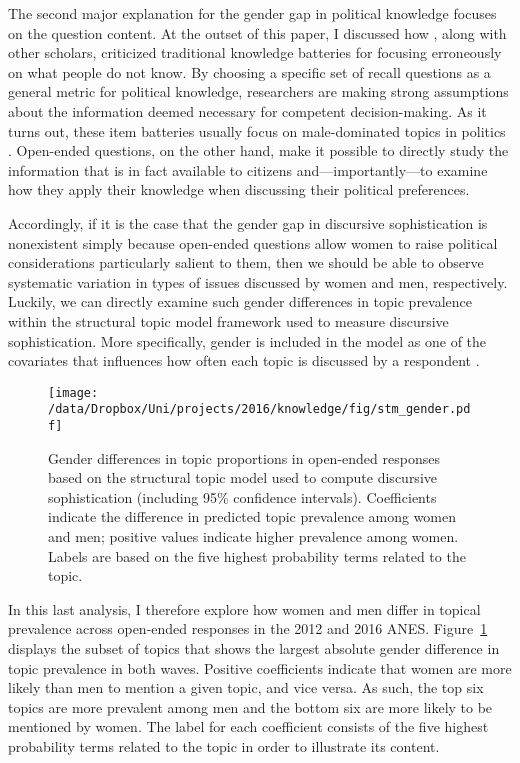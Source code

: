 The second major explanation for the gender gap in political knowledge focuses on the question content. At the outset of this paper, I discussed how \citet{cramer2017fact}, along with other scholars, criticized traditional knowledge batteries for focusing erroneously on what people do not know. By choosing a specific set of recall questions as a general metric for political knowledge, researchers are making strong assumptions about the information deemed necessary for competent decision-making. As it turns out, these item batteries usually focus on male-dominated topics in politics \citep{dolan2011women}. Open-ended questions, on the other hand, make it possible to directly study the information that is in fact available to citizens and---importantly---to examine how they apply their knowledge when discussing their political preferences.

Accordingly, if it is the case that the gender gap in discursive sophistication is nonexistent simply because open-ended questions allow women to raise political considerations particularly salient to them, then we should be able to observe systematic variation in types of issues discussed by women and men, respectively. Luckily, we can directly examine such gender differences in topic prevalence within the structural topic model framework used to measure discursive sophistication. More specifically, gender is included in the model as one of the covariates that influences how often each topic is discussed by a respondent \citep[see also][for details]{roberts2014structural}.

\begin{figure}[h]\centering
\texttt{[image: /data/Dropbox/Uni/projects/2016/knowledge/fig/stm\_gender.pdf]}
\caption[Gender differences in topic proprtions in open-ended responses]{Gender differences in topic proportions in open-ended responses based on the structural topic model used to compute discursive sophistication (including 95\% confidence intervals). Coefficients indicate the difference in predicted topic prevalence among women and men; positive values indicate higher prevalence among women. Labels are based on the five highest probability terms related to the topic.
}\label{fig:stm_gender}
\end{figure}

In this last analysis, I therefore explore how women and men differ in topical prevalence across open-ended responses in the 2012 and 2016 ANES. Figure~\ref{fig:stm_gender} displays the subset of topics that shows the largest absolute gender difference in topic prevalence in both waves. Positive coefficients indicate that women are more likely than men to mention a given topic, and vice versa. As such, the top six topics are more prevalent among men and the bottom six are more likely to be mentioned by women. The label for each coefficient consists of the five highest probability terms related to the topic in order to illustrate its content.

